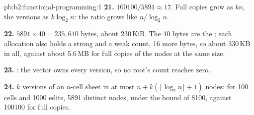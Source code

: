 \begin{solution}{pb:b2:functional-programming:1}
\textbf{21.} $100100 / 5891 \approx 17$. Full copies grow as $kn$, the  versions as $k \log_2 n$: the ratio
grows like $n / \log_2 n$.

\textbf{22.} $5891 \times 40 = 235{,}640$ bytes, about 230\,KiB. The 40 bytes are the ; each
 allocation also holds a strong and a weak count, 16 more bytes, so about 330\,KB in all, against about
5.6\,MB for full copies of the nodes at the same size.

\textbf{23.} : the vector owns every version, so no root's count reaches zero.

\textbf{24.} $k$ versions of an $n$-cell sheet in at most $n + k(\lceil \log_2 n \rceil + 1)$ nodes: for 100 cells
and 1000 edits, 5891 distinct nodes, under the bound of 8100, against 100100 for full copies.
\end{solution}
